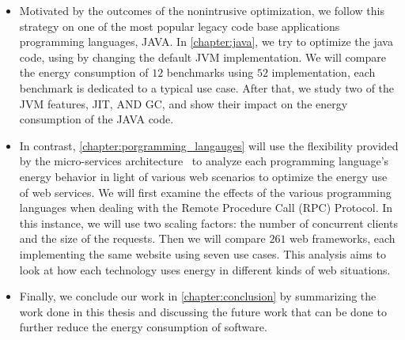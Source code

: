 \begin{itemize}
    \item Motivated by the outcomes of the nonintrusive optimization, we follow this strategy on one of the most popular legacy code base applications programming languages, JAVA. In \cref{chapter:java}, we try to optimize the java code, using by changing the default JVM implementation. We will compare the energy consumption of $12$ benchmarks using $52$ implementation, each benchmark is dedicated to a typical use case. After that, we study two of the JVM features, JIT, AND GC, and show their impact on the energy consumption of the JAVA code.
    \item In contrast, \cref{chapter:porgramming_langauges} will use the flexibility provided by the micro-services architecture~\cite{dmitry2014micro} to analyze each programming language's energy behavior in light of various web scenarios to optimize the energy use of web services. We will first examine the effects of the various programming languages when dealing with the Remote Procedure Call (RPC) Protocol. In this instance, we will use two scaling factors: the number of concurrent clients and the size of the requests. Then we will compare $261$ web frameworks, each implementing the same website using seven use cases. This analysis aims to look at how each technology uses energy in different kinds of web situations.
    \item Finally, we conclude our work in \cref{chapter:conclusion} by summarizing the work done in this thesis and discussing the future work that can be done to further reduce the energy consumption of software.
\end{itemize}


